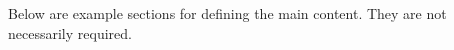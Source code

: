 \label{chap:thesis_main_content}
Below are example sections for defining the main content. They are not necessarily required.